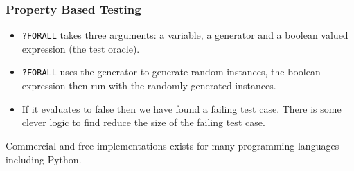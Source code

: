 \documentclass{beamer}
\begin{document}
\begin{frame}
  \frametitle{Property Based Testing}
  \begin{itemize}
  \item   {\tt ?FORALL} takes three arguments: a variable, a generator and a boolean
  valued expression (the test oracle).

\item {\tt ?FORALL} uses the generator to generate random instances, the
  boolean expression then run with the randomly generated instances.

\item If it evaluates to false then we have found a failing test case. There
  is some clever logic to find reduce the size of the failing test case.
\end{itemize}
Commercial and free implementations exists for many programming languages
including Python.

\end{frame}


\end{document}
